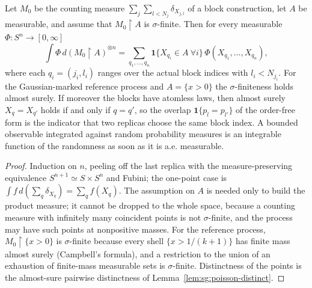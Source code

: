 \begin{theorem}\label{thm:sg:pd-blockindex}
  \leanok
Let $M_0$ be the counting measure $\sum_{j}\sum_{l<N_j}\delta_{X_{j,l}}$ of a block construction, let $A$ be measurable, and assume that $M_0\!\restriction\!A$ is $\sigma$-finite. Then for every measurable $\Phi:S^n\to[0,\infty]$
\[\int\Phi\,d(M_0\!\restriction\!A)^{\otimes n}=\sum_{q_1,\dots,q_n}\mathbf 1\{X_{q_i}\in A\ \forall i\}\,\Phi(X_{q_1},\dots,X_{q_n}),\]
where each $q_i=(j_i,l_i)$ ranges over the actual block indices with $l_i<N_{j_i}$. For the Gaussian-marked reference process and $A=\{x>0\}$ the $\sigma$-finiteness holds almost surely. If moreover the blocks have atomless laws, then almost surely $X_q=X_{q'}$ holds if and only if $q=q'$, so the overlap $\mathbf 1\{p_l=p_{l'}\}$ of the order-free form is the indicator that two replicas choose the same block index. A bounded observable integrated against random probability measures is an integrable function of the randomness as soon as it is a.e. measurable.
\end{theorem}

\begin{proof}
  \leanok
{}
Induction on $n$, peeling off the last replica with the measure-preserving equivalence $S^{n+1}\simeq S\times S^n$ and Fubini; the one-point case is $\int f\,d(\sum_q\delta_{X_q})=\sum_qf(X_q)$. The assumption on $A$ is needed only to build the product measure; it cannot be dropped to the whole space, because a counting measure with infinitely many coincident points is not $\sigma$-finite, and the process may have such points at nonpositive masses. For the reference process, $M_0\!\restriction\!\{x>0\}$ is $\sigma$-finite because every shell $\{x>1/(k+1)\}$ has finite mass almost surely (Campbell's formula), and a restriction to the union of an exhaustion of finite-mass measurable sets is $\sigma$-finite. Distinctness of the points is the almost-sure pairwise distinctness of Lemma~\ref{lem:sg:poisson-distinct}.
\end{proof}

